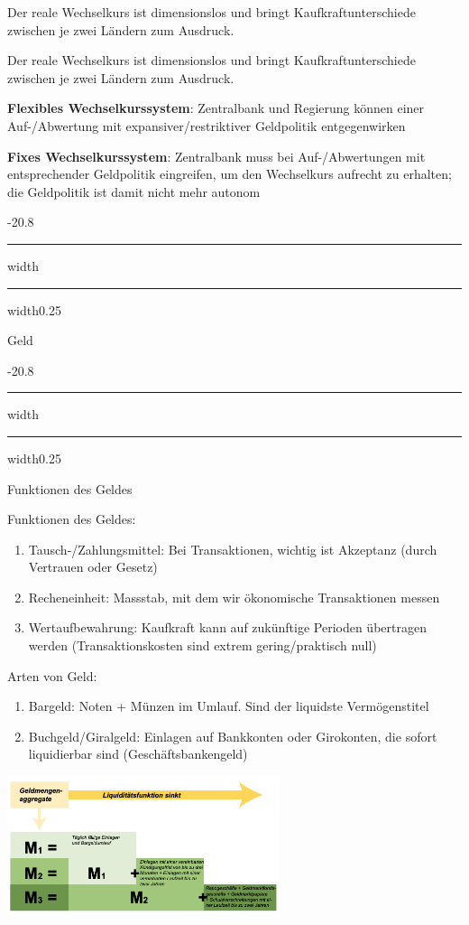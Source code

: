 \documentclass[9pt, landscape, fleqn]{scrartcl}
\makeatletter
\renewcommand{\section}{\@startsection{section}{1}{0mm}%
{-2\baselineskip}{0.8\baselineskip}%
{\hrule depth 0.2pt width\columnwidth\hrule depth1.5pt
width0.25\columnwidth\vspace*{1.2em}\Large\bfseries\rmfamily}}
\renewcommand{\subsection}{\@startsection{subsection}{1}{0mm}%
{-2\baselineskip}{0.8\baselineskip}%
{\hrule depth 0.2pt width\columnwidth\hrule depth0.75pt
width0.25\columnwidth\vspace*{1.2em}\large\bfseries\rmfamily}}
\makeatother
\begin{document}
\begin{multicols*}{3}
Der reale Wechselkurs ist dimensionslos und bringt Kaufkraftunterschiede zwischen je zwei Ländern zum Ausdruck. \newline 

Der reale Wechselkurs ist dimensionslos und bringt Kaufkraftunterschiede zwischen je zwei Ländern zum Ausdruck. \newline

\textbf{Flexibles Wechselkurssystem}: Zentralbank und Regierung können einer Auf-/Abwertung mit
expansiver/restriktiver Geldpolitik entgegenwirken \newline 

\textbf{Fixes Wechselkurssystem}: Zentralbank muss bei Auf-/Abwertungen mit entsprechender Geldpolitik eingreifen, um den Wechselkurs aufrecht zu erhalten; die Geldpolitik ist damit nicht mehr autonom

\section{Geld}

\subsection{Funktionen des Geldes}

Funktionen des Geldes: 

\begin{enumerate}
    \item Tausch-/Zahlungsmittel: Bei Transaktionen, wichtig ist Akzeptanz (durch Vertrauen oder Gesetz)
    \item Recheneinheit: Massstab, mit dem wir ökonomische Transaktionen messen 
    \item Wertaufbewahrung: Kaufkraft kann auf zukünftige Perioden übertragen werden (Transaktionskosten sind extrem gering/praktisch null)
\end{enumerate}

Arten von Geld: 

\begin{enumerate}
    \item Bargeld: Noten + Münzen im Umlauf. Sind der liquidste Vermögenstitel 
    \item Buchgeld/Giralgeld: Einlagen auf Bankkonten oder Girokonten, die sofort liquidierbar sind (Geschäftsbankengeld) 
\end{enumerate}

\begin{center}
    \includegraphics[width=8cm]{Geldmengenaggregate.png}
\end{center}


\end{multicols*}
\end{document}
